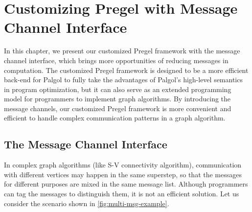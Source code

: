 \documentclass{sokendai_thesis} %
\begin{document}
\chapter{Customizing Pregel with Message Channel Interface}
\label{sec:customized}

In this chapter, we present our customized Pregel framework with the message channel interface, which brings more opportunities of reducing messages in computation.
The customized Pregel framework is designed to be a more efficient back-end for Palgol to fully take the advantages of Palgol's high-level semantics in program optimization, but it can also serve as an extended programming model for programmers to implement graph algorithms.
By introducing the message channels, our customized Pregel framework is more convenient and efficient to handle complex communication patterns in a graph algorithm.

\section{The Message Channel Interface}

In complex graph algorithms (like S-V connectivity algorithm), communication with different vertices may happen in the same superstep, so that the messages for different purposes are mixed in the same message list.
Although programmers can tag the messages to distinguish them, it is not an efficient solution.
Let us consider the scenario shown in \autoref{fig:multi-msg-example}.
\end{document}
